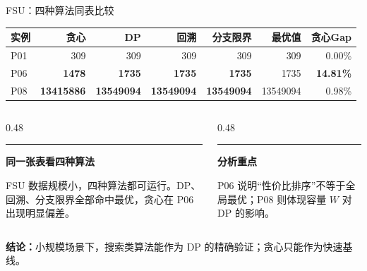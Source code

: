\documentclass[9pt]{ctexbeamer}
\newenvironment{leftblock}[1]{%
  \vspace{0.3cm}
  \begin{beamercolorbox}[wd=\textwidth,leftskip=0.4cm,rightskip=0.4cm]{}
    \textcolor{ember}{\rule{2.5pt}{0.55cm}}\hspace{0.2cm}
    {\bfseries\color{ink}#1}
    \par\vspace{0.1cm}
    \hspace{0.35cm}\begin{minipage}{\dimexpr\textwidth-1.2cm\relax}
}{%
    \end{minipage}
  \end{beamercolorbox}
  \vspace{0.15cm}
}
\newcommand{\hi}[1]{\textcolor{ember}{\textbf{#1}}}
\newcommand{\blu}[1]{\textcolor{accent}{\textbf{#1}}}
\begin{document}
\begin{frame}{FSU：四种算法同表比较}

\vspace{-0.18cm}
\begin{table}
\renewcommand{\arraystretch}{1.28}
\footnotesize
\begin{tabular}{p{1.15cm}r rrrr r}
\toprule
\textbf{实例} & \textbf{贪心} & \textbf{DP} & \textbf{回溯} & \textbf{分支限界} & \textbf{最优值} & \textbf{贪心Gap} \\
\midrule
P01 & 309 & 309 & 309 & 309 & 309 & 0.00\% \\
P06 & \hi{1478} & \blu{1735} & \blu{1735} & \blu{1735} & 1735 & \hi{14.81\%} \\
P08 & \hi{13415886} & \blu{13549094} & \blu{13549094} & \blu{13549094} & 13549094 & 0.98\% \\
\bottomrule
\end{tabular}
\end{table}

\vspace{0.15cm}
\begin{columns}[T]
\begin{column}{0.48\textwidth}
\begin{leftblock}{同一张表看四种算法}
{\footnotesize\color{slate}
FSU 数据规模小，四种算法都可运行。DP、回溯、分支限界全部命中最优，贪心在 P06 出现明显偏差。}
\end{leftblock}
\end{column}
\begin{column}{0.48\textwidth}
\begin{leftblock}{分析重点}
{\footnotesize\color{slate}
P06 说明“性价比排序”不等于全局最优；P08 则体现容量 $W$ 对 DP 的影响。}
\end{leftblock}
\end{column}
\end{columns}

\vspace{0.1cm}
\begin{center}
{\footnotesize\color{ink}\textbf{结论：}小规模场景下，搜索类算法能作为 DP 的精确验证；贪心只能作为快速基线。}
\end{center}

\end{frame}
\end{document}
